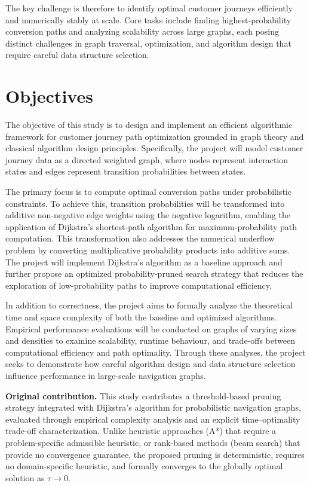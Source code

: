 The key challenge is therefore to identify optimal customer journeys efficiently and numerically stably at scale. Core tasks include finding highest-probability conversion paths and analyzing scalability across large graphs, each posing distinct challenges in graph traversal, optimization, and algorithm design that require careful data structure selection.

\section{Objectives}

The objective of this study is to design and implement an efficient algorithmic framework for customer journey path optimization grounded in graph theory and classical algorithm design principles. Specifically, the project will model customer journey data as a directed weighted graph, where nodes represent interaction states and edges represent transition probabilities between states.

The primary focus is to compute optimal conversion paths under probabilistic constraints. To achieve this, transition probabilities will be transformed into additive non-negative edge weights using the negative logarithm, enabling the application of Dijkstra's shortest-path algorithm for maximum-probability path computation. This transformation also addresses the numerical underflow problem by converting multiplicative probability products into additive sums. The project will implement Dijkstra's algorithm as a baseline approach and further propose an optimized probability-pruned search strategy that reduces the exploration of low-probability paths to improve computational efficiency.

In addition to correctness, the project aims to formally analyze the theoretical time and space complexity of both the baseline and optimized algorithms. Empirical performance evaluations will be conducted on graphs of varying sizes and densities to examine scalability, runtime behaviour, and trade-offs between computational efficiency and path optimality. Through these analyses, the project seeks to demonstrate how careful algorithm design and data structure selection influence performance in large-scale navigation graphs.

\noindent\textbf{Original contribution.} This study contributes a threshold-based pruning strategy integrated with Dijkstra's algorithm for probabilistic navigation graphs, evaluated through empirical complexity analysis and an explicit time--optimality trade-off characterization. Unlike heuristic approaches (A*) that require a problem-specific admissible heuristic, or rank-based methods (beam search) that provide no convergence guarantee, the proposed pruning is deterministic, requires no domain-specific heuristic, and formally converges to the globally optimal solution as $\tau \to 0$.

